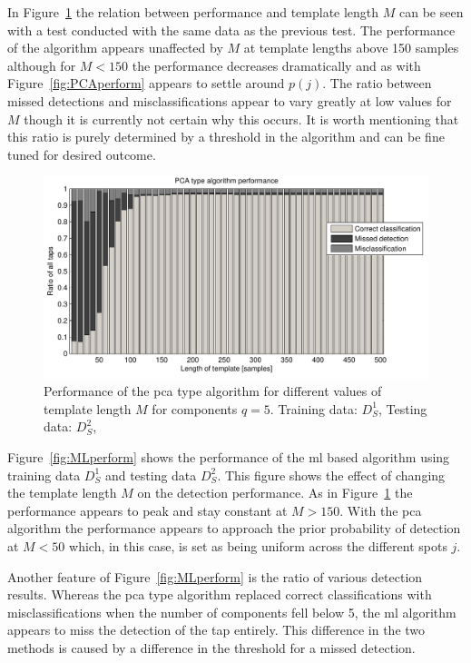 In Figure~\ref{fig:PCAperformLength} the relation between performance and template length $M$ can be seen with a test conducted with the same data as the previous test. The performance of the algorithm appears unaffected by $M$ at template lengths above 150 samples although for $M<150$ the performance decreases dramatically and as with Figure~\ref{fig:PCAperform} appears to settle around $p(j)$. The ratio between missed detections and misclassifications appear to vary greatly at low values for $M$ though it is currently not certain why this occurs. It is worth mentioning that this ratio is purely determined by a threshold in the algorithm and can be fine tuned for desired outcome.

\begin{figure}[!] %
\centering
\includegraphics[width=150mm]{PCAperformLength.pdf}
\caption{Performance of the \gls{pca} type algorithm for different values of template length $M$ for components $q=5$. Training data: $D^1_S$, Testing data: $D^2_S$,}\label{fig:PCAperformLength}
\end{figure}

Figure~\ref{fig:MLperform} shows the performance of the \gls{ml} based algorithm using training data $D^1_S$ and testing data $D^2_S$. This figure shows the effect of changing the template length $M$ on the detection performance. As in Figure~\ref{fig:PCAperformLength} the performance appears to peak and stay constant at $M>150$. With the \gls{pca} algorithm the performance appears to approach the prior probability of detection at $M<50$ which, in this case, is set as being uniform across the different spots $j$.

Another feature of Figure~\ref{fig:MLperform} is the ratio of various detection results. Whereas the \gls{pca} type algorithm replaced correct classifications with misclassifications when the number of components fell below 5, the \gls{ml} algorithm appears to miss the detection of the tap entirely. This difference in the two methods is caused by a difference in the threshold for a missed detection.


